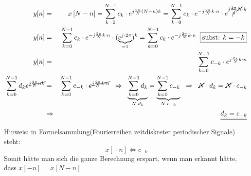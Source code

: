 \begin{uebsp}
\begin{Answer}
\begin{enumerate}[a)]
        \begin{eqnarray*}
            y[n]&=&x\left[N-n\right]=\sum_{k=0}^{N-1}c_k\cdot e^{j\frac{2\pi}{N}\left(N-n\right)k}=
            \sum_{k=0}^{N-1}c_k\cdot e^{-j\frac{2\pi}{N}k\cdot n}\cdot e^{j\frac{2\pi}{\cancel N}\cancel N\cdot k}\\
            y[n]&=&\sum_{k=0}^{N-1}c_k\cdot e^{-j\frac{2\pi}{N}k\cdot n}\cdot (\underbrace{e^{j\cdot 2\pi}}_{=1})^k=\sum_{k=0}^{N-1}c_k\cdot e^{-j\frac{2\pi}{N}k\cdot n}\;\;\fbox{subst: $k=-k$}\\
            y[n]&=&\sum_{k=0}^{N-1}c_{-k}\cdot e^{j\frac{2\pi}{N}k\cdot n}\\
            \sum_{k=0}^{N-1}d_k\cancel{e^{j\frac{2\pi}{N}nk}}&=&\sum_{k=0}^{N-1}c_{-k}\cdot \cancel{e^{j\frac{2\pi}{N}k\cdot n}}\;\;\Rightarrow\;\;
            \underbrace{\sum_{k=0}^{N-1}d_{k}}_{N\cdot d_{k}}=\underbrace{\sum_{k=0}^{N-1}c_{-k}}_{N\cdot c_{-k}}\;\;\Rightarrow\;\;
            \cancel N\cdot d_k=\cancel N\cdot c_{-k}\\
            &\Rightarrow& \underline{\underline{d_k=c_{-k}}}
        \end{eqnarray*}
            \begin{uebsp_theory}
                Hinweis: in Formelsammlung(Fourierreihen zeitdiskreter periodischer Signale) steht:
                \[x[-n]\Leftrightarrow c_{-k}\]
                Somit hätte man sich die ganze Berechnung erspart, wenn man erkannt hätte, dass $x[-n]=x[N-n]$.
            \end{uebsp_theory}


\end{enumerate}
\end{Answer}
\end{uebsp}
